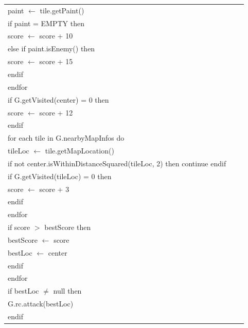 \documentclass{article}
\newenvironment{pseudobox}
{
\centering
\begin{longtable}{|p{0.94\linewidth}|}
\hline
}
{
\\ \hline
\end{longtable}
\vspace{0.05cm}
}
\begin{document}
\begin{pseudobox}
\hspace*{3em} paint $\leftarrow$ tile.getPaint() \\
\hspace*{3em} if paint = EMPTY then \\
\hspace*{4em} score $\leftarrow$ score + 10 \\
\hspace*{3em} else if paint.isEnemy() then \\
\hspace*{4em} score $\leftarrow$ score + 15 \\
\hspace*{3em} endif \\
\hspace*{2em} endfor \\

\hspace*{2em} if G.getVisited(center) = 0 then \\
\hspace*{3em} score $\leftarrow$ score + 12 \\
\hspace*{2em} endif \\

\hspace*{2em} for each tile in G.nearbyMapInfos do \\
\hspace*{3em} tileLoc $\leftarrow$ tile.getMapLocation() \\
\hspace*{3em} if not center.isWithinDistanceSquared(tileLoc, 2) then continue endif \\
\hspace*{3em} if G.getVisited(tileLoc) = 0 then \\
\hspace*{4em} score $\leftarrow$ score + 3 \\
\hspace*{3em} endif \\
\hspace*{2em} endfor \\

\hspace*{2em} if score $>$ bestScore then \\
\hspace*{3em} bestScore $\leftarrow$ score \\
\hspace*{3em} bestLoc $\leftarrow$ center \\
\hspace*{2em} endif \\
\hspace*{1em} endfor \\

\hspace*{1em} if bestLoc $\neq$ null then \\
\hspace*{2em} G.rc.attack(bestLoc) \\
\hspace*{1em} endif
\end{pseudobox}
\end{document}
